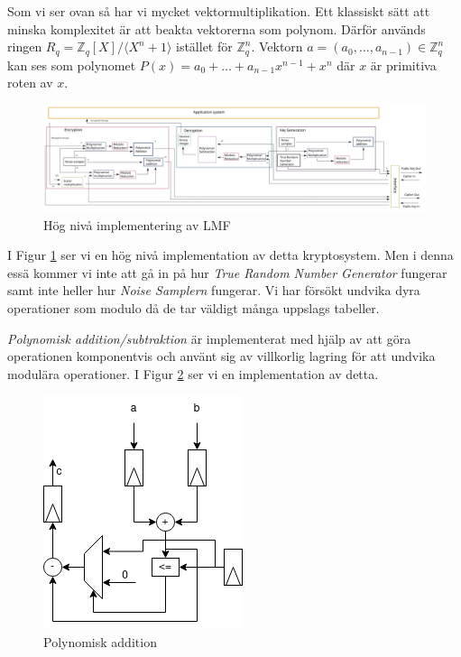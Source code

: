 \documentclass{paper}
\newcommand{\bZ}{\mathbb{Z}}
\begin{document}
Som vi ser ovan så har vi mycket vektormultiplikation. Ett klassiskt sätt att
minska komplexitet är att beakta vektorerna som polynom. Därför används ringen
$R_q = \bZ_q [X] / \langle X^n + 1 \rangle$ istället för $\bZ^n_q$. Vektorn
$a = (a_0, \ldots, a_{n-1}) \in \bZ^n_q$ kan ses som polynomet
$P(x) = a_0 + \ldots + a_{n-1} x^{n-1} + x^n$ där $x$ är primitiva roten av
$x$.

\begin{figure}[H]
    \centering
    \includegraphics[scale=0.15]{high_level_impl.png}
    \caption{Hög nivå implementering av LMF \citep{FPGA_post_quantum}}
    \label{fig:high_level_impl}
\end{figure}

I Figur \ref{fig:high_level_impl} ser vi en hög nivå implementation av detta
kryptosystem. Men i denna essä kommer vi inte att gå in på hur \textit{True
Random Number Generator} fungerar samt inte heller hur \textit{Noise Samplern}
fungerar. Vi har försökt undvika dyra operationer som modulo då de tar väldigt
många uppslags tabeller.

\textit{Polynomisk addition/subtraktion} är implementerat med hjälp
av att göra operationen komponentvis och använt sig av villkorlig lagring
för att undvika modulära operationer. I Figur \ref{fig:pol_add} ser vi en
implementation av detta.

\begin{figure}[H]
    \centering
    \includegraphics[scale=0.5]{images/polynomial_addition.png}
    \caption{Polynomisk addition}
    \label{fig:pol_add}
\end{figure}
\end{document}
